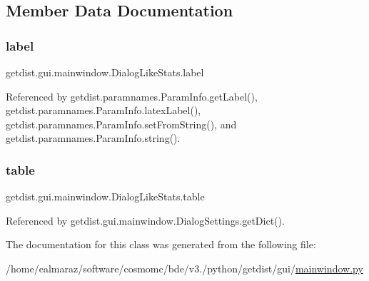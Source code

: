 \subsection{Member Data Documentation}
\mbox{\label{classgetdist_1_1gui_1_1mainwindow_1_1DialogLikeStats_add2855829c270e57adf15d396a8d3e5c}} 
\subsubsection{\texorpdfstring{label}{label}}
{\footnotesize\ttfamily getdist.\+gui.\+mainwindow.\+Dialog\+Like\+Stats.\+label}



Referenced by getdist.\+paramnames.\+Param\+Info.\+get\+Label(), getdist.\+paramnames.\+Param\+Info.\+latex\+Label(), getdist.\+paramnames.\+Param\+Info.\+set\+From\+String(), and getdist.\+paramnames.\+Param\+Info.\+string().

\mbox{\label{classgetdist_1_1gui_1_1mainwindow_1_1DialogLikeStats_a664e82d4fcc5db061997eb791f40b605}} 
\subsubsection{\texorpdfstring{table}{table}}
{\footnotesize\ttfamily getdist.\+gui.\+mainwindow.\+Dialog\+Like\+Stats.\+table}



Referenced by getdist.\+gui.\+mainwindow.\+Dialog\+Settings.\+get\+Dict().



The documentation for this class was generated from the following file\+:\begin{DoxyCompactItemize}
\item 
/home/ealmaraz/software/cosmomc/bde/v3./python/getdist/gui/\mbox{\hyperlink{mainwindow_8py}{mainwindow.\+py}}\end{DoxyCompactItemize}
